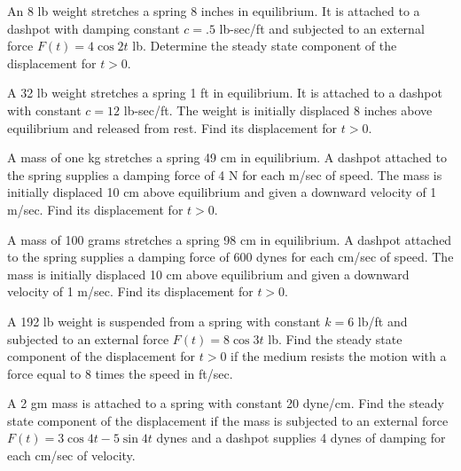 \documentclass{ximera}
\begin{document}
\begin{problem}\label{exer:6.2.13}
  An 8 lb weight stretches a spring 8 inches in equilibrium.
It is attached to a dashpot with damping constant $c=.5$ lb-sec/ft
and subjected to an external force  $F(t)=4\cos2t$ lb.
Determine the steady state component of the displacement for $t>0$.
\end{problem}

\begin{problem}\label{exer:6.2.14}
A 32 lb weight stretches a spring 1 ft in equilibrium. It is attached
to a dashpot with constant $c=12$ lb-sec/ft. The weight is initially
displaced 8 inches above equilibrium and released from rest. Find its
displacement for $t>0$.
\end{problem}

\begin{problem}\label{exer:6.2.15}
A mass of one kg stretches a spring 49 cm in equilibrium. A dashpot
attached to the spring supplies a damping force of 4 N for each m/sec
of speed. The mass is initially displaced 10 cm above equilibrium and
given a downward velocity of 1 m/sec. Find its displacement for $t>0$.
\end{problem}

\begin{problem}\label{exer:6.2.16}
A mass of 100 grams stretches a spring 98 cm in equilibrium. A dashpot
attached to the spring supplies a damping force of 600 dynes for each
cm/sec of speed. The mass is initially displaced 10 cm above
equilibrium and given a downward velocity of 1 m/sec. Find its
displacement for $t>0$.
\end{problem}

\begin{problem}\label{exer:6.2.17}
A 192 lb weight is suspended from a spring with constant $k=6$ lb/ft
and subjected to an external force $F(t)=8\cos3t$ lb. Find the steady
state component of the displacement for $t>0$ if the medium resists
the motion with a force  equal to 8 times the speed in
ft/sec.
\end{problem}

\begin{problem}\label{exer:6.2.18}
A 2 gm mass is attached to a spring with constant 20 dyne/cm. Find the
steady state component of the displacement if the mass is subjected to
an external force $F(t)=3\cos4t-5\sin4t$ dynes and a dashpot supplies
4 dynes of damping for each cm/sec of velocity.
\end{problem}
\end{document}
